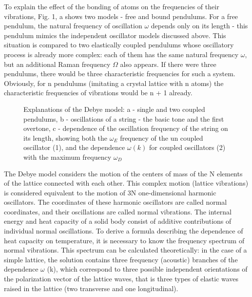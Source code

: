 \documentclass[a4paper,14pt]{extreport}
\begin{document}
To explain the effect of the bonding of atoms on the frequencies of their vibrations, Fig. 1, a shows two models - free and bound pendulums. For a free pendulum, the natural frequency of oscillation $ \omega $ depends only on its length - this pendulum mimics the independent oscillator models discussed above.
This situation is compared to two elastically coupled pendulums whose oscillatory process is already more complex: each of them has the same natural frequency $ \omega $, but an additional Raman frequency $ \Omega $ also appears. If there were three pendulums, there would be three characteristic frequencies for such a system. Obviously, for n pendulums (imitating a crystal lattice with n atoms) the characteristic frequencies of vibrations would be n + 1 already.\\
\begin{figure}[h]
\caption{Explanations of the Debye model: a - single and two coupled pendulums, b - oscillations of a string - the basic tone and the first overtone, c - dependence of the oscillation frequency of the string on its length, showing both the $ \omega_E $ frequency of the un coupled oscillator (1), and the dependence $ \omega (k) $ for coupled oscillators (2) with the maximum frequency $ \omega_D $}
\label{ris1}
\end{figure}












The Debye model considers the motion of the centers of mass of the N elements of the lattice connected with each other. This complex motion (lattice vibrations) is considered equivalent to the motion of 3N one-dimensional harmonic oscillators. The coordinates of these harmonic oscillators are called normal coordinates, and their oscillations are called normal vibrations.
The internal energy and heat capacity of a solid body consist of additive contributions of individual normal oscillations. To derive a formula describing the dependence of heat capacity on temperature, it is necessary to know the frequency spectrum of normal vibrations. This spectrum can be calculated theoretically: in the case of a simple lattice, the solution contains three frequency (acoustic) branches of the dependence $ \omega $ (k), which correspond to three possible independent orientations of the polarization vector of the lattice waves, that is three types of elastic waves raised in the lattice (two transverse and one longitudinal). \\
\end{document}
